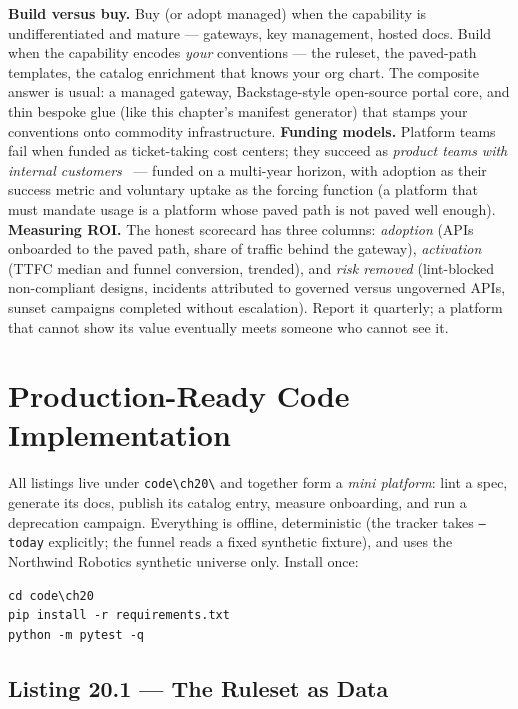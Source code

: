 \textbf{Build versus buy.} Buy (or adopt managed) when the capability is
undifferentiated and mature --- gateways, key management, hosted docs.
Build when the capability encodes \emph{your} conventions --- the ruleset,
the paved-path templates, the catalog enrichment that knows your org
chart. The composite answer is usual: a managed gateway, Backstage-style
open-source portal core, and thin bespoke glue (like this chapter's
manifest generator) that stamps your conventions onto commodity
infrastructure. \textbf{Funding models.} Platform teams fail when funded
as ticket-taking cost centers; they succeed as \emph{product teams with
internal customers}~\cite{newman2021microservices} --- funded on a
multi-year horizon, with adoption as their success metric and voluntary
uptake as the forcing function (a platform that must mandate usage is a
platform whose paved path is not paved well enough). \textbf{Measuring
ROI.} The honest scorecard has three columns: \emph{adoption} (APIs
onboarded to the paved path, share of traffic behind the gateway),
\emph{activation} (TTFC median and funnel conversion, trended), and
\emph{risk removed} (lint-blocked non-compliant designs, incidents
attributed to governed versus ungoverned APIs, sunset campaigns completed
without escalation). Report it quarterly; a platform that cannot show its
value eventually meets someone who cannot see it.

\section{Production-Ready Code Implementation}
\label{sec:ch20-code}

All listings live under \texttt{code\textbackslash{}ch20\textbackslash{}}
and together form a \emph{mini platform}: lint a spec, generate its docs,
publish its catalog entry, measure onboarding, and run a deprecation
campaign. Everything is offline, deterministic (the tracker takes
\texttt{--today} explicitly; the funnel reads a fixed synthetic fixture),
and uses the Northwind Robotics synthetic universe only. Install once:

\begin{verbatim}
cd code\ch20
pip install -r requirements.txt
python -m pytest -q
\end{verbatim}

\subsection{Listing 20.1 --- The Ruleset as Data}
\label{sec:ch20-listing-ruleset}

